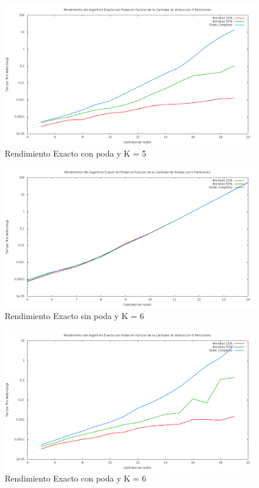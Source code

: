 \begin{figure}[H]
\begin{center}
\includegraphics[scale=0.3]{finales/rendimientoExactoConPoda5Particiones.png}
\caption{Rendimiento Exacto con poda y K = 5}
\end{center}
\end{figure}

\begin{figure}[H]
\begin{center}
\includegraphics[scale=0.3]{finales/rendimientoExactoSinPoda6Particiones.png}
\caption{Rendimiento Exacto sin poda y K = 6}
\end{center}
\end{figure}

\begin{figure}[H]
\begin{center}
\includegraphics[scale=0.3]{finales/rendimientoExactoConPoda6Particiones.png}
\caption{Rendimiento Exacto con poda y K = 6}
\end{center}
\end{figure}

